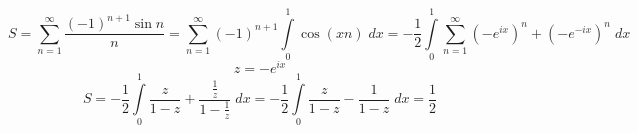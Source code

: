 


	$$S = \sum_{n= 1}^{\infty} \frac{(-1)^{n+1} \sin n}{n} =  \sum_{n= 1}^{\infty} (-1)^{n+1}\int \limits_{0}^{1} \cos(xn) \; dx = -\frac{1}{2} \int \limits_{0}^{1} \sum_{n= 1}^{\infty} (-e^{ix})^n+(-e^{-ix})^n \; dx $$
	$$z = -e^{ix}$$
	$$S = -\frac{1}{2} \int \limits_{0}^{1} \frac{z}{1-z}+\frac{\frac{1}{z}}{1-\frac{1}{z}} \; dx  =-\frac{1}{2} \int \limits_{0}^{1} \frac{z}{1-z}-\frac{1}{1-z} \; dx = \frac{1}{2} $$
	
